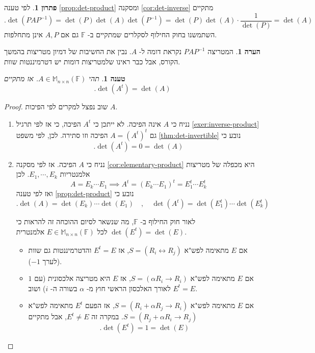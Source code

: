 \documentclass[12pt]{report}
\theoremstyle{plain}
\newtheorem{proposition}[theorem]{טענה}
\theoremstyle{definition}
\newtheorem{remark}{הערה}[chapter]
\newtheorem*{solution}{פתרון}
\newcommand{\F}{\mathbb{F}}
\newcommand{\M}{\mathbb{M}}
\newcommand{\0}{\mathbf{0}}
\begin{document}
\begin{solution}
לפי טענה
\ref{prop:det-product}
ומסקנה
\ref{cor:det-inverse}
מתקיים
$$
.\det(PAP^{-1})=\det(P)\det(A)\det(P^{-1})=\det(P)\det(A)\cdot\frac{1}{\det(P)}=\det(A)
$$
השתמשנו בחוק החילוף לסקלרים שמתקיים ב-
$\F$ 
גם אם 
$A,P$
אינן מתחלפות.
\end{solution}

\begin{remark}
המטריצה 
$PAP^{-1}$
נקראת דומה ל-
$A$.
נבין את החשיבות של דמיון מטריצות בהמשך הקורס, אבל כבר ראינו שלמטריצות דומות יש דטרמיננטות שוות.
\end{remark}

\begin{proposition}\label{prop:det-transpose}
תהי
$A\in\M_{n\times n}(\F)$.
אז מתקיים
$$
.\det(A^t)=\det(A)
$$
\end{proposition}

\begin{proof}
שוב נפצל למקרים לפי הפיכות 
$A$.

\begin{enumerate}[label=\alph*.]
\item
נניח כי
$A$
אינה הפיכה. לא ייתכן כי
$A^t$
הפיכה, כי אז לפי תרגיל
\ref{exer:inverse-product}
גם 
$A=(A^t)^t$
הפיכה וזו סתירה. לכן, לפי משפט
\ref{thm:det-invertible}
נובע כי
$$
.\det(A^t)=0=\det(A)
$$


\item 
נניח כי
$A$
הפיכה. אז לפי מסקנה
\ref{cor:elementary-product}
היא מכפלה של מטריצות אלמנטריות
$E_1,\cdots,E_k$.
לכן
$$
A=E_k\cdots E_1 \implies A^t=(E_k\cdots E_1)^t=E_1^t\cdots E_k^t
$$
ואז לפי טענה
\ref{prop:det-product}
נובע כי
$$
.\det(A)=\det(E_k)\cdots\det(E_1)\quad,\quad \det(A^t)=\det(E_1^t)\cdots\det(E_k^t)
$$

לאור חוק החילוף ב-
$\F$,
מה שנשאר לסיום ההוכחה זה להראות כי
$\det(E^t)=\det(E)$
לכל 
$E\in\M_{n\times n}(\F)$
אלמנטרית.
\begin{itemize}
\item
אם
$E$
מתאימה לפש"א 
$S=(R_i\leftrightarrow R_j)$,
אז
$E^t=E$
והדטרמיננטות גם שוות (לערך
$-1$).


\item
אם 
$E$
מתאימה לפש"א
$S=(\alpha R_i\to R_i)$,
אז 
$E$
היא מטריצה אלכסונית (עם 
$1$
לאורך האלכסון הראשי חוץ מ-
$\alpha$
בשורה ה-
$i$)
ושוב
$E^t=E$.


\item
אם
$E$
מתאימה לפש"א 
$S=(R_i+\alpha R_j\to R_i)$,
אז הפעם
$E^t$
מתאימה לפש"א
$S=(R_j+\alpha R_i\to R_j)$.
במקרה זה 
$E^t\neq E$,
אבל מתקיים
$$
.\det(E^t)=1=\det(E)
$$
\end{itemize}
\end{enumerate}
\end{proof}
\end{document}
